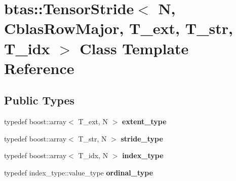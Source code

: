 \hypertarget{classbtas_1_1_tensor_stride_3_01_n_00_01_cblas_row_major_00_01_t__ext_00_01_t__str_00_01_t__idx_01_4}{
\section{btas::TensorStride$<$ N, CblasRowMajor, T\_\-ext, T\_\-str, T\_\-idx $>$ Class Template Reference}
\label{classbtas_1_1_tensor_stride_3_01_n_00_01_cblas_row_major_00_01_t__ext_00_01_t__str_00_01_t__idx_01_4}
}
\subsection*{Public Types}
\begin{DoxyCompactItemize}
\item 
\hypertarget{classbtas_1_1_tensor_stride_3_01_n_00_01_cblas_row_major_00_01_t__ext_00_01_t__str_00_01_t__idx_01_4_a4d8ec5ffb1e115876185be492eba2e23}{
typedef boost::array$<$ T\_\-ext, N $>$ {\bfseries extent\_\-type}}
\label{classbtas_1_1_tensor_stride_3_01_n_00_01_cblas_row_major_00_01_t__ext_00_01_t__str_00_01_t__idx_01_4_a4d8ec5ffb1e115876185be492eba2e23}

\item 
\hypertarget{classbtas_1_1_tensor_stride_3_01_n_00_01_cblas_row_major_00_01_t__ext_00_01_t__str_00_01_t__idx_01_4_ac22bb864970a6decba5498d9e4035253}{
typedef boost::array$<$ T\_\-str, N $>$ {\bfseries stride\_\-type}}
\label{classbtas_1_1_tensor_stride_3_01_n_00_01_cblas_row_major_00_01_t__ext_00_01_t__str_00_01_t__idx_01_4_ac22bb864970a6decba5498d9e4035253}

\item 
\hypertarget{classbtas_1_1_tensor_stride_3_01_n_00_01_cblas_row_major_00_01_t__ext_00_01_t__str_00_01_t__idx_01_4_aab82dd8ba9cf8335c177cf6ac18c91e1}{
typedef boost::array$<$ T\_\-idx, N $>$ {\bfseries index\_\-type}}
\label{classbtas_1_1_tensor_stride_3_01_n_00_01_cblas_row_major_00_01_t__ext_00_01_t__str_00_01_t__idx_01_4_aab82dd8ba9cf8335c177cf6ac18c91e1}

\item 
\hypertarget{classbtas_1_1_tensor_stride_3_01_n_00_01_cblas_row_major_00_01_t__ext_00_01_t__str_00_01_t__idx_01_4_a063658d1cee715cbe7938017801069b0}{
typedef index\_\-type::value\_\-type {\bfseries ordinal\_\-type}}
\label{classbtas_1_1_tensor_stride_3_01_n_00_01_cblas_row_major_00_01_t__ext_00_01_t__str_00_01_t__idx_01_4_a063658d1cee715cbe7938017801069b0}

\end{DoxyCompactItemize}
